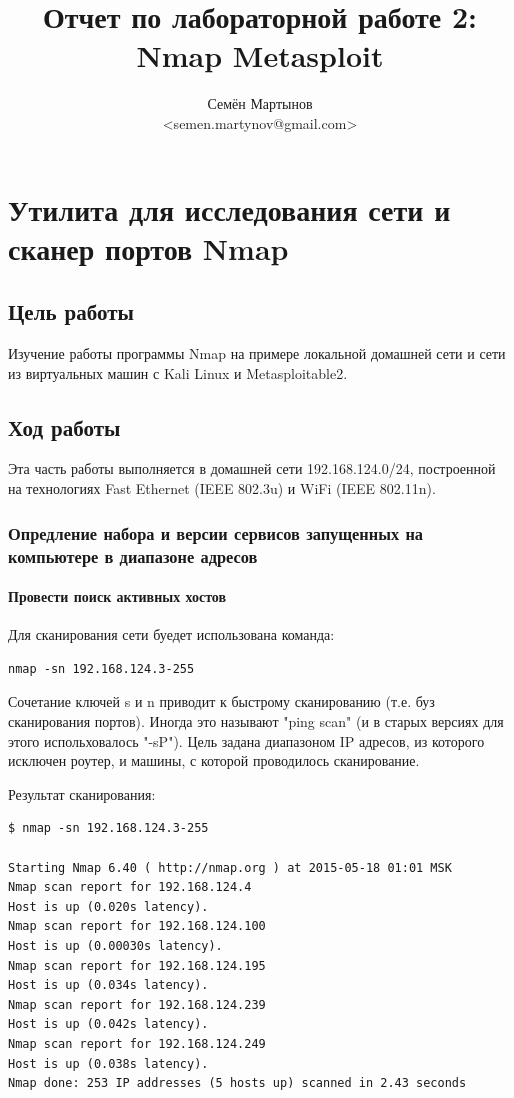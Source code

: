 \documentclass[a4paper, 12pt]{article}		%
\author{Семён Мартынов\\<semen.martynov@gmail.com>}
\title{Отчет по лабораторной работе 2:\\Nmap Metasploit}
\begin{document}
\maketitle
\tableofcontents{}

\newpage
\section{Утилита для исследования сети и сканер портов Nmap}

\subsection{Цель работы}

Изучение работы программы Nmap на примере локальной домашней сети и сети из виртуальных машин с Kali Linux и Metasploitable2.

\subsection{Ход работы}

Эта часть работы выполняется в домашней сети 192.168.124.0/24, построенной на технологиях Fast Ethernet (IEEE 802.3u) и WiFi (IEEE 802.11n).

\subsubsection{Опредление набора и версии сервисов запущенных на компьютере в диапазоне адресов}

\paragraph{Провести поиск активных хостов} Для сканирования сети буедет использована команда:
\begin{Verbatim}[frame=single]
nmap -sn 192.168.124.3-255
\end{Verbatim}

Сочетание ключей s и n приводит к быстрому сканированию (т.е. буз сканирования портов). Иногда это называют "ping scan" (и в старых версиях для этого испольховалось "-sP"). Цель задана диапазоном IP адресов, из которого исключен роутер, и машины, с которой проводилось сканирование.

Результат сканирования:
\begin{Verbatim}[frame=single]
$ nmap -sn 192.168.124.3-255

Starting Nmap 6.40 ( http://nmap.org ) at 2015-05-18 01:01 MSK
Nmap scan report for 192.168.124.4
Host is up (0.020s latency).
Nmap scan report for 192.168.124.100
Host is up (0.00030s latency).
Nmap scan report for 192.168.124.195
Host is up (0.034s latency).
Nmap scan report for 192.168.124.239
Host is up (0.042s latency).
Nmap scan report for 192.168.124.249
Host is up (0.038s latency).
Nmap done: 253 IP addresses (5 hosts up) scanned in 2.43 seconds
\end{Verbatim}
\end{document}
